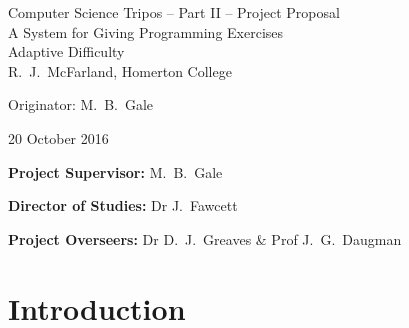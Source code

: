 \documentclass[12pt,a4paper,twoside]{article}
\begin{document}
\begin{center}
\Large
Computer Science Tripos -- Part II -- Project Proposal\\[4mm]
\LARGE
A System for Giving Programming Exercises \\Adaptive Difficulty\\[4mm]

\large
R.~J.~McFarland, Homerton College

Originator: M.~B.~Gale

20 October 2016
\end{center}

\vspace{5mm}

\textbf{Project Supervisor:} M.~B.~Gale

\textbf{Director of Studies:} Dr J.~Fawcett

\textbf{Project Overseers:} Dr D.~J.~Greaves  \& Prof J.~G.~Daugman


\section*{Introduction}
\end{document}
